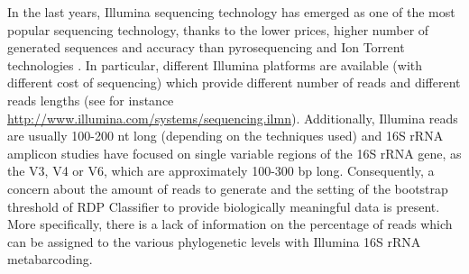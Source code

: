 In the last years, Illumina sequencing technology has emerged as one of the most popular sequencing technology, thanks to the lower prices, higher number of generated sequences and accuracy than pyrosequencing and Ion Torrent technologies \cite{degnan2011illumina, gloor2010microbiome, bartram2011generation, claesson2010comparison, salipante2014performance}. In particular, different Illumina platforms are available (with different cost of sequencing) which provide different number of reads and different reads lengths (see for instance \href{http://www.illumina.com/systems/sequencing.ilmn}{http://\-www.\-illumi\-na\-.com/\-sys\-tems/\-sequen\-cing\-.ilmn}). Additionally, Illumina reads are usually 100-200 nt long (depending on the techniques used) and 16S rRNA amplicon studies have focused on single variable regions of the 16S rRNA gene, as the V3, V4 or V6, which are approximately 100-300 bp long. Consequently, a concern about the amount of reads to generate and the setting of the bootstrap threshold of RDP Classifier to provide biologically meaningful data is present. More specifically, there is a lack of information on the percentage of reads which can be assigned to the various phylogenetic levels with Illumina 16S rRNA metabarcoding.\\

